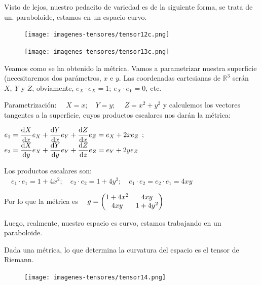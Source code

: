 Visto de lejos, nuestro pedacito de variedad es de la siguiente forma, se trata de un. paraboloide, estamos en un espacio curvo.
\begin{multicols}{2}
\begin{figure}[H]
		\centering
		\texttt{[image: imagenes-tensores/tensor12c.png]}
	\end{figure}
	
	\begin{figure}[H]
		\centering
		\texttt{[image: imagenes-tensores/tensor13c.png]}
	\end{figure}
\end{multicols}

Veamos como se ha obtenido la métrica. Vamos a parametrizar nuestra superficie (necesitaremos dos parámetros, $x \text{ e } y$. Las coordenadas cartesianas de $\mathbb R^3$ serán $X,\ Y \text{ y } Z$, obviamente, $e_X\cdot e_X=1; \ e_X\cdot e_Y=0,\ $etc. 

Parametrización: $\quad X=x;\quad Y=y;\ \quad Z=x^2+y^2$ y calculemos los vectores tangentes a la superficie, cuyos productos escalares nos darán la métrica:

$\displaystyle e_1=\dv{X}{x}e_X+\dv{Y}{x}e_Y+\dv{Z}{x}e_Z=e_X+2xe_Z$
$; \quad$
$\displaystyle e_2=\dv{X}{y}e_X+\dv{Y}{y}e_Y+\dv{Z}{z}e_Z=e_Y+2ye_Z$

Los productos escalares son: $\quad e_1\cdot e_1=1+4x^2;\quad e_2\cdot e_2=1+4y^2;\quad e_1\cdot e_2=e_2\cdot e_1=4xy$

Por lo que la métrica es $ \quad g=\mqty(1+4x^2&4xy\\4xy&1+4y^2)$

Luego, realmente, nuestro espacio es curvo, estamos trabajando en un paraboloide.

\textcolor{gris}{Dada una métrica, lo que determina la curvatura del espacio es el tensor de Riemann.}








\vspace{20mm}
\begin{figure}[H]
		\centering
		\texttt{[image: imagenes-tensores/tensor14.png]}
	\end{figure}
\vspace{20mm}	
	


